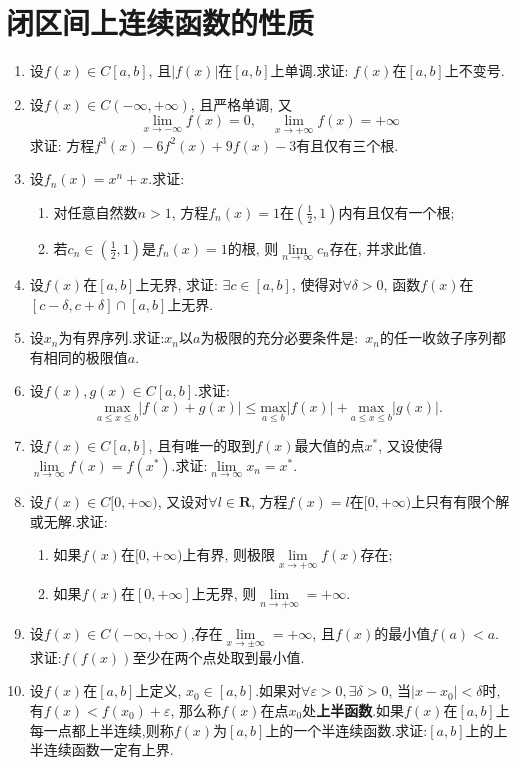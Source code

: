 \section{闭区间上连续函数的性质}
\begin{enumerate}
	\item 设$f(x)\in C[a,b]$, 且$|f(x)|$在$[a,b]$上单调.求证: $f(x)$在$[a,b]$上不变号.
	\item 设$f(x)\in C(-\infty,+\infty)$, 且严格单调, 又
	$$
	\lim\limits_{x\rightarrow -\infty}f(x) = 0,\quad \lim\limits_{x\rightarrow +\infty}f(x)=+\infty$$
	求证: 方程$f^3(x)-6f^2(x)+9f(x)-3$有且仅有三个根.
	\item 设$f_n(x)=x^n+x$.求证:
	\begin{enumerate}
		\item 对任意自然数$n>1$, 方程$f_n(x)=1$在$(\frac{1}{2},1)$内有且仅有一个根;
		\item 若$c_n\in (\frac{1}{2},1)$是$f_n(x)=1\text{的根, 则}\lim\limits_{n \rightarrow \infty}c_n$存在, 并求此值.
	\end{enumerate}
	\item 设$f(x)$在$[a,b]$上无界, 求证: $\exists c\in[a,b]$, 使得对$\forall \delta>0$, 函数$f(x)$在$[c-\delta,c+\delta]\cap[a,b]$上无界.
	\item 设${x_n}$为有界序列.求证:${x_n}$以$a$为极限的充分必要条件是:\ ${x_n}$的任一收敛子序列都有相同的极限值$a$.
	\item 设$f(x),g(x)\in C[a,b]$.求证:
	$$\underset{a\leq x\le b}{\mathrm{max}}|f(x)+g(x)|\le \underset{a\le b}{\mathrm{max}}|f(x)|+\underset{a\le x \le b}{\mathrm{max}}|g(x)|.$$
	\item 设$f(x)\in C[a,b]$, 且有唯一的取到$f(x)$最大值的点$x^*$, 又设使得$\lim\limits_{n \rightarrow  \infty}f(x)=f(x^*)$.求证:$\lim\limits_{n \rightarrow \infty}x_n=x^*$.
	\item 设$f(x)\in C[0,+\infty)$, 又设对$\forall l\in \textbf{R}$, 方程$f(x)=l$在$[0,+\infty)$上只有有限个解或无解.求证:
	\begin{enumerate}
		\item 如果$f(x)$在$[0, +\infty)$上有界, 则极限$\lim\limits_{x\rightarrow +\infty}f(x)$存在;
		\item 如果$f(x)$在$[0,+\infty]$上无界, 则$\lim\limits_{n\rightarrow +\infty}=+\infty$.
	\end{enumerate}
	\item 设$f(x)\in C(-\infty,+\infty)$,存在$\lim\limits_{x\rightarrow \pm\infty}=+\infty$, 且$f(x)$的最小值$f(a)<a$.求证:$f(f(x))$至少在两个点处取到最小值.
	\item 设$f(x)$在$[a,b]$上定义, $x_0\in[a,b]$.如果对$\forall \varepsilon >0, \exists \delta >0 $, 当$|x-x_0|<\delta$时, 有$f(x)<f(x_0)+\varepsilon$, 那么称$f(x)$在点$x_0$处\textbf{上半函数}.如果$f(x)$在$[a,b]$上每一点都上半连续,则称$f(x)$为$[a,b]$上的一个半连续函数.求证:$[a,b]$上的上半连续函数一定有上界.

\end{enumerate}
